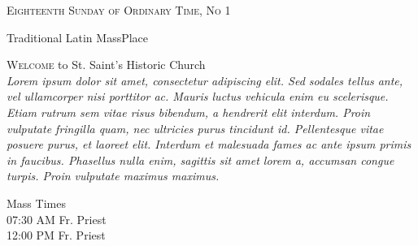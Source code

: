 \documentclass[10pt,a4paper]{article}
\newcommand{\JournalIssue}[1]{\hfill \textsc{Eighteenth Sunday of Ordinary Time, No #1}}
\newcommand{\SepRule}{\noindent
\begin{center}
	\hrulefill\hspace{0.2cm} \floweroneleft\floweroneright \hspace{0.2cm} \hrulefill
\end{center}
}
\newcommand{\JournalName}[2]{
\begin{center}	
	\Huge#1\linebreak\small#2
\end{center}
}
\newcommand{\IlluminateFirstChar}[3]{
	\large\lettrine[lines=5, lraise=-0.07, nindent=0.0em, slope=-0em]{\fontsize{85}{60}\usefont{U}{GoudyIn}{xl}{n}\color{BrickRed}#1}{#2}#3\vspace{0.1cm}\\
}
\begin{document}
\JournalIssue{1}
\JournalName{Traditional Latin Mass}{Place}
\vspace{0.5cm}

\begin{center}
\begin{minipage}[h]{0.75\linewidth}
\IlluminateFirstChar{W}{elcome}{ to St. Saint's Historic Church}
\emph{Lorem ipsum dolor sit amet, consectetur adipiscing elit. Sed sodales tellus ante, vel ullamcorper nisi porttitor ac. Mauris luctus vehicula enim eu scelerisque. Etiam rutrum sem vitae risus bibendum, a hendrerit elit interdum. Proin vulputate fringilla quam, nec ultricies purus tincidunt id. Pellentesque vitae posuere purus, et laoreet elit. Interdum et malesuada fames ac ante ipsum primis in faucibus. Phasellus nulla enim, sagittis sit amet lorem a, accumsan congue turpis. Proin vulputate maximus maximus.}
\end{minipage}

\vspace{1cm}
Mass Times\\
07:30 AM  Fr. Priest\\
12:00 PM  Fr. Priest
\end{center}

\vspace{0.5cm}
\SepRule
\vspace{0.5cm}
\end{document}

